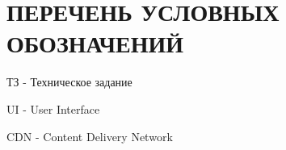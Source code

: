 \section*{ПЕРЕЧЕНЬ УСЛОВНЫХ ОБОЗНАЧЕНИЙ}

ТЗ - Техническое задание

UI - User Interface

CDN - Content Delivery Network
